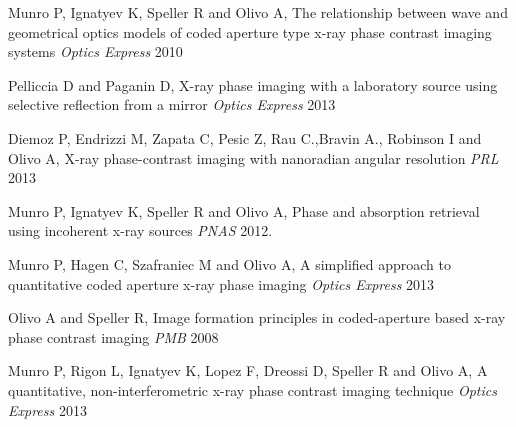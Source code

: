 \documentclass[letterpaper,12pt]{amsart} %
\begin{document}
 \begin{thebibliography}{1}

   Munro P, Ignatyev K, Speller R and Olivo A, The relationship between wave and geometrical optics models of coded aperture type x-ray phase contrast imaging systems {\em Optics Express}  2010

   Pelliccia D and Paganin D, X-ray phase imaging with a laboratory source using selective reflection from a mirror {\em Optics Express} 2013

   Diemoz P, Endrizzi M, Zapata C, Pesic Z, Rau C.,Bravin A., Robinson I and Olivo A, X-ray phase-contrast imaging with nanoradian angular resolution {\em PRL} 2013

   Munro P, Ignatyev K, Speller R and Olivo A, Phase and absorption retrieval using incoherent x-ray sources {\em PNAS} 2012.

   Munro P, Hagen C, Szafraniec M and Olivo A, A simplified approach to quantitative coded aperture x-ray phase imaging {\em Optics Express} 2013

   Olivo A and Speller R, Image formation principles in coded-aperture based x-ray phase contrast imaging {\em PMB} 2008

   Munro P, Rigon L, Ignatyev K, Lopez F, Dreossi D, Speller R and Olivo A, A quantitative, non-interferometric x-ray phase contrast imaging technique {\em Optics Express} 2013
  \end{thebibliography}
\end{document}
